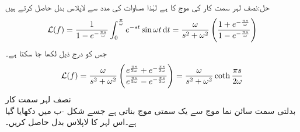 حل:نصف لہر سمت کار کی موج کا  ہے لہٰذا مساوات  کی مدد سے لاپلاس بدل حاصل کرتے ہیں
\begin{align}
\Laplace(f)=\frac{1}{1-e^{-\frac{\pi s}{\omega}}}\int_{0}^{\frac{\pi}{\omega}} e^{-st}\sin \omega t\dif t=\frac{\omega}{s^2+\omega^2} \left(\frac{1+e^{-\frac{\pi s}{\omega}}}{1-e^{-\frac{\pi s}{\omega}}}\right)
\end{align}
جس کو درج ذیل لکھا جا سکتا ہے۔
\begin{align*}
\mathcal{L}(f)=\frac{\omega}{s^2+\omega^2} \left(\frac{e^{\frac{\pi s}{2\omega}}+e^{-\frac{\pi s}{2\omega}}}{e^{\frac{\pi s}{2\omega}}-e^{-\frac{\pi s}{2\omega}}}\right)=\frac{\omega}{s^2+\omega^2}\coth \frac{\pi s}{2\omega}
\end{align*}
\quad نصف لہر سمت کار\\
 بدلتی سمت سائن نما موج سے یک سمتی موج بناتی ہے جسے شکل -ب میں دکھایا گیا ہے۔اس لہر کا لاپلاس بدل حاصل کریں۔


